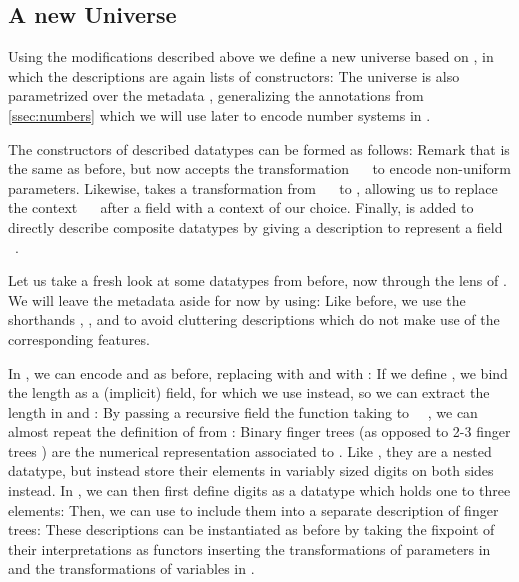 \subsection{A new Universe}\label{ssec:desc}
Using the modifications described above we define a new universe based on , in which the descriptions are again lists of constructors:
The universe  is also parametrized over the metadata , generalizing the annotations from \autoref{ssec:numbers} which we will use later to encode number systems in .

The constructors of described datatypes can be formed as follows:
Remark that  is the same as before, but  now accepts the transformation \ \  to encode non-uniform parameters. Likewise,  takes a transformation  from \ \  to , allowing us to replace the context \ \  after a field with a context  of our choice. Finally,  is added to directly describe composite datatypes by giving a description  to represent a field \ .

Let us take a fresh look at some datatypes from before, now through the lens of . We will leave the metadata aside for now by using:
Like before, we use the shorthands , , and  to avoid cluttering descriptions which do not make use of the corresponding features. 

In , we can encode \bN{} and  as before, replacing  with  and  with :
If we define , we bind the length as a (implicit) field, for which we use  instead, so we can extract the length  in  and :
By passing a recursive field  the function taking  to \ \ , we can almost repeat the definition of  from :
Binary finger trees (as opposed to 2-3 finger trees \cite{fingertrees}) are the numerical representation associated to . Like , they are a nested datatype, but instead store their elements in variably sized digits on both sides instead. In , we can then first define digits as a datatype which holds one to three elements:
Then, we can use  to include them into a separate description of finger trees:
These descriptions can be instantiated as before by taking the fixpoint
of their interpretations as functors
inserting the transformations of parameters  in  and the transformations of variables  in .

